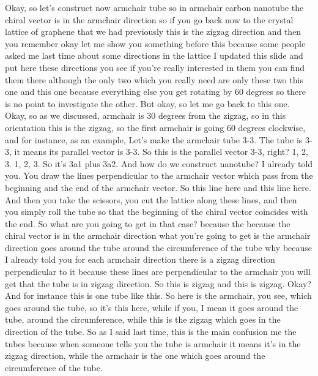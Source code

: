 Okay, so let's construct now armchair tube so in armchair carbon nanotube the chiral vector is in the armchair direction so if you go back now to the crystal lattice of graphene that we had previously this is the zigzag direction and then you remember okay let me show you something before this because some people asked me last time about some directions in the lattice I updated this slide and put here these directions you see if you're really interested in them you can find them there although the only two which you really need are only these two this one and this one because everything else you get rotating by 60 degrees so there is no point to investigate the other. But okay, so let me go back to this one. Okay, so as we discussed, armchair is 30 degrees from the zigzag, so in this orientation this is the zigzag, so the first armchair is going 60 degrees clockwise, and for instance, as an example, Let's make the armchair tube 3-3. The tube is 3-3, it means its parallel vector is 3-3. So this is the parallel vector 3-3, right? 1, 2, 3. 1, 2, 3. So it's 3a1 plus 3a2. And how do we construct nanotube? I already told you. You draw the lines perpendicular to the armchair vector which pass from the beginning and the end of the armchair vector. So this line here and this line here. And then you take the scissors, you cut the lattice along these lines, and then you simply roll the tube so that the beginning of the chiral vector coincides with the end. So what are you going to get in that case? because the because the chiral vector is in the armchair direction what you're going to get is the armchair direction goes around the tube around the circumference of the tube why because I already told you for each armchair direction there is a zigzag direction perpendicular to it because these lines are perpendicular to the armchair you will get that the tube is in zigzag direction. So this is zigzag and this is zigzag. Okay?
And for instance this is one tube like this. So here is the armchair, you see, which goes around the tube, so it's this here, while if you, I mean it goes around the tube, around the circumference, while this is the zigzag which goes in the direction of the tube. So as I said last time, this is the main confusion me the tubes because when someone tells you the tube is armchair it means it's in the zigzag direction, while the armchair is the one which goes around the circumference of the tube.
